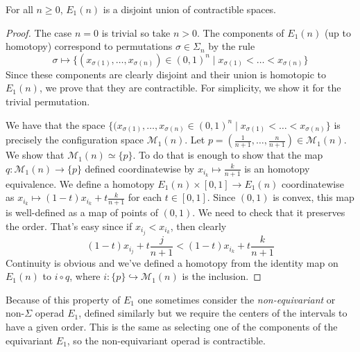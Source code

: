 \documentclass[TFM.tex]{subfiles}
\begin{document}
\begin{prop}\label{E1}
For all $n\geq 0$, $E_1(n)$ is a disjoint union of contractible spaces.
\end{prop}
\begin{proof}
The case $n=0$ is trivial so take $n>0$. The components of $E_1(n)$ (up to homotopy) correspond to permutations $\sigma\in\Sigma_n$ by the rule
\[
\sigma\mapsto \{(x_{\sigma(1)},\dots, x_{\sigma(n)})\in (0,1)^n\mid x_{\sigma(1)}<\dots< x_{\sigma(n)}\}
\]
Since these components are clearly disjoint and their union is homotopic to $E_1(n)$, we prove that they are contractible. For simplicity, we show it for the trivial permutation. 

We have that the space $\{(x_{\sigma(1)},\dots, x_{\sigma(n)}\in (0,1)^n\mid x_{\sigma(1)}<\dots< x_{\sigma(n)}\}$  is precisely the configuration space $\mathcal{M}_1(n)$. Let $p=\left(\frac{1}{n+1},\dots, \frac{n}{n+1}\right)\in \mathcal{M}_1(n)$. We show that $\mathcal{M}_1(n)\simeq \{p\}$. To do that is enough to show that the map $q:\mathcal{M}_1(n)\to \{p\}$ defined coordinatewise by $x_{i_k}\mapsto \frac{k}{n+1}$ is an homotopy equivalence. We define a homotopy $E_1(n)\times [0,1]\to E_1(n)$ coordinatewise as $x_{i_k}\mapsto (1-t)x_{i_k}+t\frac{k}{n+1}$ for each $t\in [0,1]$. Since $(0,1)$ is convex, this map is well-defined as a map of points of $(0,1)$. We need to check that it preserves the order. That's easy since if $x_{i_j}<x_{i_k}$, then clearly 
\[
(1-t)x_{i_j}+t\frac{j}{n+1}<(1-t)x_{i_k}+t\frac{k}{n+1}
\] 
Continuity is obvious and we've defined a homotopy from the identity map on $E_1(n)$ to $i\circ q$, where $i:\{p\}\hookrightarrow \mathcal{M}_1(n)$ is the inclusion. 
\end{proof}

Because of this property of $E_1$ one sometimes consider the \emph{non-equivariant} or non-$\Sigma$ operad $E_1$, defined similarly but we require the centers of the intervals to have a given order. This is the same as selecting one of the components of the equivariant $E_1$, so the non-equivariant operad is contractible. 
\end{document}
